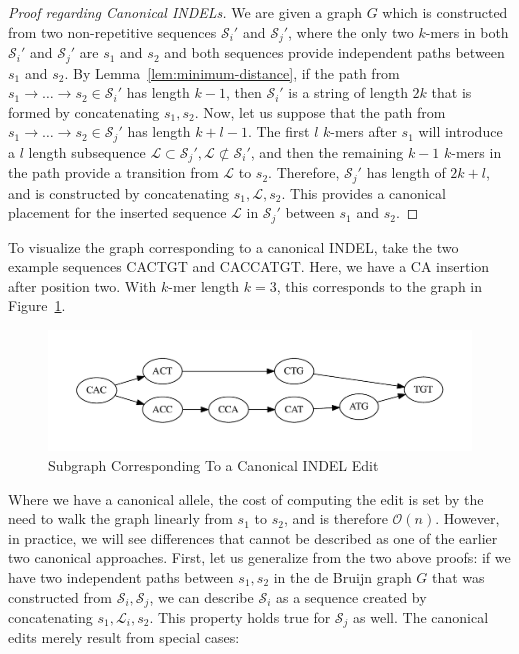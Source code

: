 \documentclass[phd]{ucbthesis}
\begin{document}
\begin{proof}[Proof regarding Canonical INDELs]
\label{proof:canonical-indels}
We are given a graph $G$ which is constructed from two non-repetitive sequences $\mathcal{S}_i'$ and
$\mathcal{S}_j'$, where the only two $k$-mers in both $\mathcal{S}_i'$ and $\mathcal{S}_j'$ are $s_1$
and $s_2$ and both sequences provide independent paths between $s_1$ and $s_2$. By
Lemma~\ref{lem:minimum-distance}, if the path from $s_1 \rightarrow \dots \rightarrow s_2 \in
\mathcal{S}_i'$ has length $k - 1$, then $\mathcal{S}_i'$ is a string of length $2k$ that is formed by
concatenating $s_1, s_2$. Now, let us suppose that the path from $s_1 \rightarrow \dots \rightarrow s_2
\in \mathcal{S}_j'$ has length $k + l - 1$. The first $l$ $k$-mers after $s_1$ will introduce a $l$ length
subsequence $\mathcal{L} \subset \mathcal{S}_j', \mathcal{L} \not\subset \mathcal{S}_i'$, and then the
remaining $k - 1$ $k$-mers in the path provide a transition from $\mathcal{L}$ to $s_2$. Therefore,
$\mathcal{S}_j'$ has length of $2k + l$, and is constructed by concatenating $s_1, \mathcal{L}, s_2$.
This provides a canonical placement for the inserted sequence $\mathcal{L}$ in $\mathcal{S}_j'$ between
$s_1$ and $s_2$.
\end{proof}

To visualize the graph corresponding to a canonical INDEL, take the two example sequences
\textsc{CACTGT} and \textsc{CACCATGT}. Here, we have a \textsc{CA} insertion after position two. With
$k$-mer length $k = 3$, this corresponds to the graph in Figure~\ref{fig:indel}.

\begin{figure}[h]
\begin{center}
\includegraphics[width=0.95\linewidth, clip=true, trim=0 39 0 39]{graphs/indel.pdf}
\end{center}
\caption{Subgraph Corresponding To a Canonical INDEL Edit}
\label{fig:indel}
\end{figure}

Where we have a canonical allele, the cost of computing the edit is set by the need to walk the graph
linearly from $s_1$ to $s_2$, and is therefore $\mathcal{O}(n)$. However, in practice, we will see
differences that cannot be described as one of the earlier two canonical approaches. First, let us
generalize from the two above proofs: if we have two independent paths between $s_1, s_2$ in the
de Bruijn graph $G$ that was constructed from $\mathcal{S}_i, \mathcal{S}_j$, we can describe
$\mathcal{S}_i$ as a sequence created by concatenating $s_1, \mathcal{L}_i, s_2$. This
property holds true for $\mathcal{S}_j$ as well. The canonical edits merely result from special cases:
\end{document}
